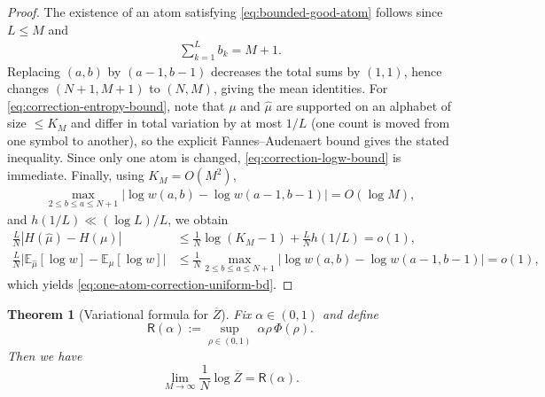 \documentclass[11pt]{amsart}
\numberwithin{equation}{section}
\numberwithin{equation}{section}
\newcommand{\1}{\mathbbm{1}}
\newcommand{\E}{\mathbb{E}}
\newtheorem{theorem}{Theorem}[section]
\theoremstyle{definition}
\begin{document}
\begin{proof}
The existence of an atom satisfying \eqref{eq:bounded-good-atom} follows since $L \le M$ and
\begin{align*}
    \sum_{k=1}^{L} b_k = M+1.
\end{align*}
Replacing $(a,b)$ by $(a-1,b-1)$
decreases the total sums by $(1,1)$, hence changes $(N+1,M+1)$ to $(N,M)$, giving the mean identities. For \eqref{eq:correction-entropy-bound}, note that $\mu$ and $\widehat\mu$ are supported on an alphabet of size $\le K_M$ and differ in total variation by at most $1/L$ (one count is moved from one symbol to another), so the explicit Fannes--Audenaert bound gives the stated inequality. Since only one atom is changed, \eqref{eq:correction-logw-bound} is immediate. Finally, using $K_M=O(M^2)$, 
\begin{align*}
    \max_{2\le b\le a\le N+1}|\log w(a,b)-\log w(a-1,b-1)|=O(\log M),
\end{align*}
and $h(1/L)\ll (\log L)/L$, we obtain
\begin{align*}
    \frac{L}{N}\left| H(\widehat\mu)-H(\mu) \right|
    &\le \frac{1}{N}\log(K_M-1)+\frac{L}{N}h(1/L)=o(1), \\
    \frac{L}{N}\Big|\E_{\widehat\mu}[\log w]-\E_\mu[\log w]\Big|
    &\le \frac{1}{N}\max_{2\le b\le a\le N+1}\Big|\log w(a,b)-\log w(a-1,b-1)\Big|=o(1),
\end{align*}
which yields \eqref{eq:one-atom-correction-uniform-bd}.
\end{proof}
\begin{theorem}[Variational formula for $\overline{Z}$]\label{thm:main-variational}
Fix $\alpha \in (0,1)$ and define
\[
\mathsf R(\alpha):=\sup_{\rho\in(0,1)}\ \alpha\rho\,\Phi(\rho).
\]
Then we have
\begin{equation}\label{eq:rate-full}
\lim_{M\to\infty}\frac{1}{N}\log \overline{Z}=\mathsf R(\alpha).
\end{equation}

\end{theorem}
\end{document}
